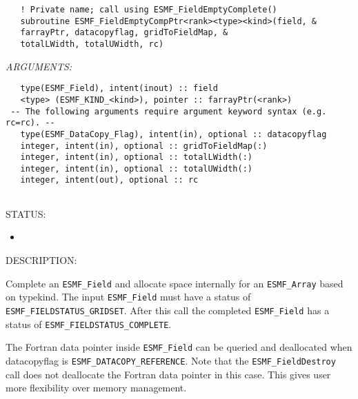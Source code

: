    
\begin{verbatim}   ! Private name; call using ESMF_FieldEmptyComplete() 
   subroutine ESMF_FieldEmptyCompPtr<rank><type><kind>(field, & 
   farrayPtr, datacopyflag, gridToFieldMap, & 
   totalLWidth, totalUWidth, rc) 
   \end{verbatim}{\em ARGUMENTS:}
\begin{verbatim}   type(ESMF_Field), intent(inout) :: field 
   <type> (ESMF_KIND_<kind>), pointer :: farrayPtr(<rank>) 
 -- The following arguments require argument keyword syntax (e.g. rc=rc). --
   type(ESMF_DataCopy_Flag), intent(in), optional :: datacopyflag 
   integer, intent(in), optional :: gridToFieldMap(:) 
   integer, intent(in), optional :: totalLWidth(:) 
   integer, intent(in), optional :: totalUWidth(:) 
   integer, intent(out), optional :: rc 
   
   \end{verbatim}
{\sf STATUS:}
   \begin{itemize} 
   \item{} 
   \end{itemize} 
   
{\sf DESCRIPTION:\\ }

 
   \begin{sloppypar} 
   Complete an {\tt ESMF\_Field} and allocate space internally for an 
   {\tt ESMF\_Array} based on typekind. 
   The input {\tt ESMF\_Field} must have a status of 
   {\tt ESMF\_FIELDSTATUS\_GRIDSET}. After this call the completed {\tt ESMF\_Field} 
   has a status of {\tt ESMF\_FIELDSTATUS\_COMPLETE}. 
   
   The Fortran data pointer inside {\tt ESMF\_Field} can be queried and deallocated when 
   datacopyflag is {\tt ESMF\_DATACOPY\_REFERENCE}. Note that the {\tt ESMF\_FieldDestroy} call does not deallocate 
   the Fortran data pointer in this case. This gives user more flexibility over memory management. 
   \end{sloppypar} 
   
